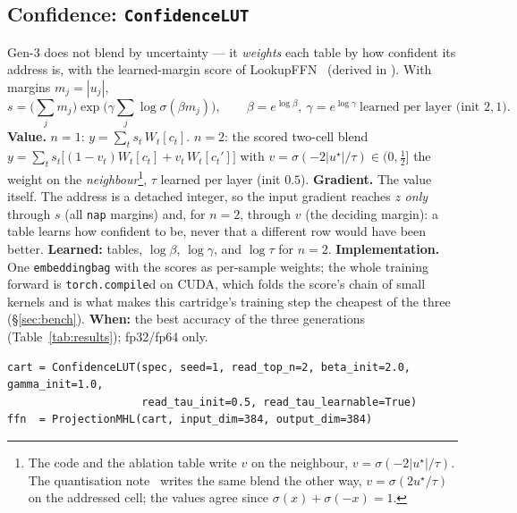 \documentclass[11pt]{article}
\DeclareRobustCommand{\code}[1]{{\renewcommand{\_}{\textunderscore\allowbreak}\texttt{#1}}}
\begin{document}
\subsection{Confidence: \code{ConfidenceLUT}}
\label{sec:confidence}
Gen-3 does not blend by uncertainty --- it \emph{weights} each table by how confident its address is,
with the learned-margin score of LookupFFN~\citep{lookupffn} (derived in \citealp[\S3, \S6]{mechanisms}).
With margins $m_j=|u_j|$,
\[
  s=\Big(\sum_j m_j\Big)\exp\!\Big(\gamma\sum_j\log\sigma(\beta m_j)\Big),\qquad
  \beta=e^{\log\beta},\ \gamma=e^{\log\gamma}\ \text{learned per layer (init $2,1$)}.
\]
\textbf{Value.} $n{=}1$: $y=\sum_t s_t\,W_t[c_t]$. $n{=}2$: the scored two-cell blend
$y=\sum_t s_t\big[(1-v_t)W_t[c_t]+v_t\,W_t[c_t']\big]$ with $v=\sigma(-2|u^\star|/\tau)\in(0,\tfrac12]$
the weight on the \emph{neighbour}\footnote{The code and the ablation table write $v$ on the neighbour,
$v=\sigma(-2|u^\star|/\tau)$. The quantisation note~\citep{quantnote} writes the same blend the other way,
$v=\sigma(2u^\star/\tau)$ on the addressed cell; the values agree since $\sigma(x)+\sigma(-x)=1$.}, $\tau$
learned per layer (init $0.5$). \textbf{Gradient.} The value itself. The address is a detached integer, so
the input gradient reaches $z$ \emph{only} through $s$ (all \code{nap} margins) and, for $n{=}2$, through
$v$ (the deciding margin): a table learns how confident to be, never that a different row would have been
better. \textbf{Learned:} tables, $\log\beta$, $\log\gamma$, and $\log\tau$ for $n{=}2$.
\textbf{Implementation.} One \code{embedding\_bag} with the scores as per-sample weights; the whole
training forward is \code{torch.compile}d on CUDA, which folds the score's chain of small kernels and is
what makes this cartridge's training step the cheapest of the three (\S\ref{sec:bench}). \textbf{When:} the best
accuracy of the three generations (Table~\ref{tab:results}); fp32/fp64 only.
\begin{lstlisting}
cart = ConfidenceLUT(spec, seed=1, read_top_n=2, beta_init=2.0, gamma_init=1.0,
                     read_tau_init=0.5, read_tau_learnable=True)
ffn  = ProjectionMHL(cart, input_dim=384, output_dim=384)
\end{lstlisting}
\end{document}
